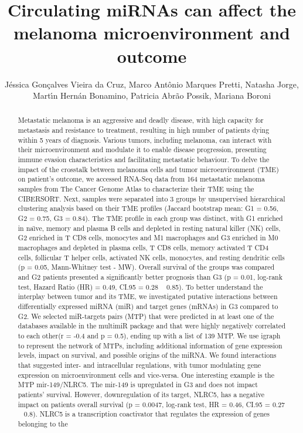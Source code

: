\documentclass[twoside]{article}
\title{\vspace{-15mm}\fontsize{24pt}{10pt}\selectfont\textbf{ Circulating miRNAs can affect the melanoma microenvironment and outcome }} %
\author{ J\'essica Gon\c{c}alves Vieira da Cruz, Marco Ant\^onio Marques Pretti, Natasha Jorge, Mart\'{\i}n Hern\'an Bonamino, Patricia Abr\~ao Possik, Mariana Boroni }
\affil{ Laboratory of Functional Genomics and Bioinformatics,  Oswaldo Cruz Institute (IOC),  Oswaldo Cruz Foundation (Fiocruz),  Rio de Janeiro,  RJ,  Brazil. }
\date{}
\begin{document}
  
  
  \maketitle %
  
  
  \thispagestyle{fancy} %
  
  
  \begin{abstract}
  Metastatic melanoma is an aggressive and deadly disease,  with high capacity for metastasis and resistance to treatment,  resulting in high number of patients dying within 5 years of diagnosis. Various tumors,  including melanoma,  can interact with their microenvironment and modulate it to enable disease progression,  presenting immune evasion characteristics and facilitating metastatic behaviour. To delve the impact of the crosstalk between melanoma cells and tumor microenvironment (TME) on patient’s outcome,  we accessed RNA-Seq data from 164 metastatic melanoma samples from The Cancer Genome Atlas to characterize their TME using the CIBERSORT. Next,  samples were separated into 3 groups by unsupervised hierarchical clustering analysis based on their TME profiles (Jaccard bootstrap mean: G1 = 0.56,  G2 = 0.75,  G3 = 0.84). The TME profile in each group was distinct,  with G1 enriched in na\"{\i}ve,  memory and plasma B cells and depleted in resting natural killer (NK) cells,  G2 enriched in T CD8 cells,  monocytes and M1 macrophages and G3 enriched in M0 macrophages and depleted in plasma cells,  T CD8 cells,  memory activated T CD4 cells,  follicular T helper cells,  activated NK cells,  monocytes,  and resting dendritic cells (p = 0.05,  Mann-Whitney test - MW). Overall survival of the groups was compared and G2 patients presented a significantly better prognosis than G3 (p = 0.01,  log-rank test,  Hazard Ratio (HR) = 0.49,  CI.95 = 0.28 ~ 0.85). To better understand the interplay between tumor and its TME,  we investigated  putative interactions between differentially expressed miRNA (miR) and target genes (mRNAs) in G3 compared to G2. We selected miR-targets pairs (MTP) that were predicted in at least one of the databases available in the multimiR package and that were highly negatively correlated to each other(r = -0.4 and p = 0.5),  ending up with a list of 139 MTP. We use igraph to represent the network of MTPs,  including additional information of gene expression levels,  impact on survival,  and possible origins of the miRNA. We found interactions that suggested inter- and intracellular regulations,  with tumor modulating gene expression on microenvironment cells and vice-versa. One interesting example is the MTP mir-149/NLRC5. The mir-149 is upregulated in G3 and does not impact patients’ survival. However,  downregulation of its target,  NLRC5,  has a negative impact on patients overall survival (p = 0.0047,  log-rank test,  HR = 0.46,  CI.95 = 0.27 ~ 0.8). NLRC5 is a transcription coactivator that regulates the expression of genes belonging to the 
\end{abstract}
\end{document}
